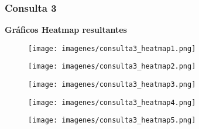 \subsubsection{Consulta 3}
\textbf{Gráficos Heatmap resultantes}
\label{anexo:consulta3_heatmap}

\begin{figure}[H]
    \centering
    \texttt{[image: imagenes/consulta3\_heatmap1.png]}
\end{figure}

\begin{figure}[H]
    \centering
    \texttt{[image: imagenes/consulta3\_heatmap2.png]}
\end{figure}

\begin{figure}[H]
    \centering
    \texttt{[image: imagenes/consulta3\_heatmap3.png]}
\end{figure}

\begin{figure}[H]
    \centering
    \texttt{[image: imagenes/consulta3\_heatmap4.png]}
\end{figure}

\begin{figure}[H]
    \centering
    \texttt{[image: imagenes/consulta3\_heatmap5.png]}
\end{figure}
